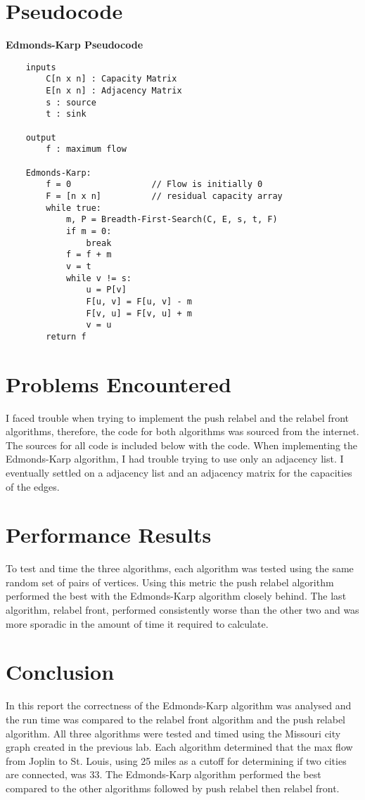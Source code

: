 \documentclass[a4paper]{article}
\begin{document}
    \section{Pseudocode}
    \textbf{Edmonds-Karp Pseudocode} \\
    \begin{verbatim}
    inputs
        C[n x n] : Capacity Matrix
        E[n x n] : Adjacency Matrix
        s : source
        t : sink
    
    output
        f : maximum flow
    
    Edmonds-Karp:
        f = 0                // Flow is initially 0
        F = [n x n]          // residual capacity array
        while true:
            m, P = Breadth-First-Search(C, E, s, t, F)
            if m = 0:
                break
            f = f + m
            v = t
            while v != s:
                u = P[v]
                F[u, v] = F[u, v] - m       
                F[v, u] = F[v, u] + m        
                v = u
        return f
    \end{verbatim}



    \section{Problems Encountered}
    I faced trouble when trying to implement the push relabel and the relabel front
    algorithms, therefore, the code for both algorithms was sourced from the internet.
    The sources for all code is included below with the code. When implementing the 
    Edmonds-Karp algorithm, I had trouble trying to use only an adjacency list. I eventually
    settled on a adjacency list and an adjacency matrix for the capacities of the edges.


    \section{Performance Results}
    To test and time the three algorithms, each algorithm was tested using the same
    random set of pairs of vertices.  Using this metric the push relabel algorithm 
    performed the best with the Edmonds-Karp algorithm closely behind. The last 
    algorithm, relabel front, performed consistently worse than the other two and was
    more sporadic in the amount of time it required to calculate.

    \section{Conclusion}
    In this report the correctness of the Edmonds-Karp algorithm was analysed and
    the run time was compared to the relabel front algorithm and the push relabel 
    algorithm. All three algorithms were tested and timed using the Missouri city graph
    created in the previous lab. Each algorithm determined that the max flow from Joplin
    to St. Louis, using 25 miles as a cutoff for determining if two cities are 
    connected, was 33. The Edmonds-Karp algorithm performed the best compared to the 
    other algorithms followed by push relabel then relabel front. 
\end{document}
